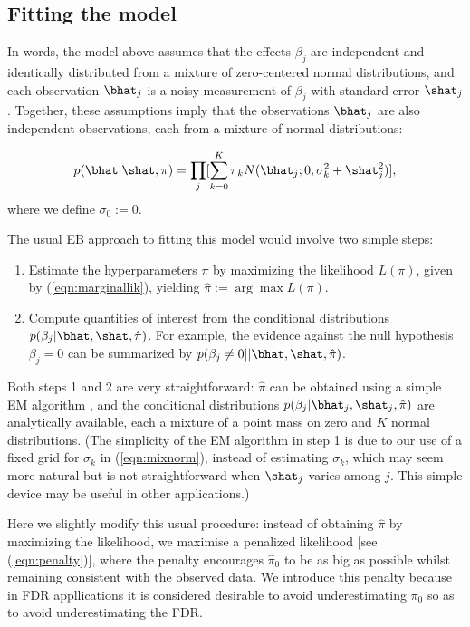 \subsection*{Fitting the model}

In words, the model above assumes that the effects $\beta_j$ are independent and identically distributed from a mixture of zero-centered normal distributions, and 
each observation $\bhat_j$ is a noisy measurement of $\beta_j$ with standard error $\shat_j$.
Together, these assumptions imply that the observations $\bhat_j$ are also independent observations, each from a mixture of normal distributions:

\begin{equation}
\label{eqn:marginallik}
p(\bhat | \shat, \pi) =   \prod_j  [\sum_{k=0}^K \pi_k N(\bhat_j; 0, \sigma_k^2 + \shat_j^2)],
\end{equation}
where we define $\sigma_0:=0$.

The usual EB approach to fitting this model would involve two simple steps:

\begin{enumerate}
\item Estimate the hyperparameters $\pi$ by maximizing the likelihood $L(\pi)$, given by (\ref{eqn:marginallik}), yielding $\hat{\pi} := \arg \max L(\pi)$.
\item Compute quantities of interest from the conditional distributions $p(\beta_j | \bhat, \shat, \hat{\pi})$. For example, the evidence
against the null hypothesis $\beta_j=0$ can be summarized by $p(\beta_j \neq 0 | | \bhat, \shat,\hat{\pi})$.
\end{enumerate}
Both steps 1 and 2 are very straightforward: $\hat{\pi}$ can be obtained using a simple EM algorithm \cite{dempster77}, and the conditional distributions $p(\beta_j | \bhat_j, \shat_j,\hat{\pi})$ are analytically available, each a mixture of a point mass on zero and $K$ normal distributions.
(The simplicity of the EM algorithm in step 1 is due to our use of a fixed grid for $\sigma_k$ in (\ref{eqn:mixnorm}), instead of estimating $\sigma_k$,
which may seem more natural but is not straightforward when $\shat_j$ varies among $j$. This simple device may be useful in other applications.)

Here we slightly modify this usual procedure: instead of obtaining $\hat\pi$ by maximizing the likelihood, we maximise a penalized
likelihood [see (\ref{eqn:penalty})], where the penalty encourages $\hat\pi_0$ to be as big as possible whilst remaining consistent with the observed data. 
We introduce this penalty because in FDR appllications it is considered desirable to avoid underestimating $\pi_0$ so as to avoid underestimating the FDR.

